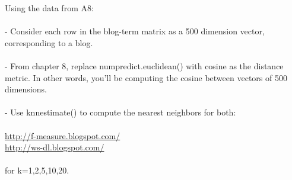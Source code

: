 Using the data from A8:\\
\\
- Consider each row in the blog-term matrix as a 500 dimension vector, 
corresponding to a blog. \\
\\
- From chapter 8, replace numpredict.euclidean() with cosine as the 
distance metric.  In other words, you'll be computing the cosine between
vectors of 500 dimensions.\\
\\
- Use knnestimate() to compute the nearest neighbors for both:\\
\\
\url{http://f-measure.blogspot.com/}\\
\url{http://ws-dl.blogspot.com/}\\
\\
for k={1,2,5,10,20}.\\
